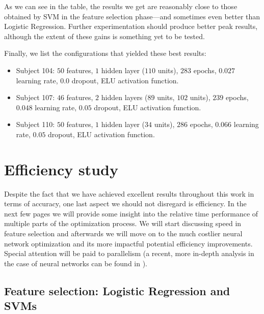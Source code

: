     As we can see in the table, the results we get are reasonably close to those obtained by \acs{SVM} in the feature selection phase---and sometimes even better than Logistic Regression. Further experimentation should produce better peak results, although the extent of these gains is something yet to be tested.

    Finally, we list the configurations that yielded these best results:

    \begin{itemize}

    	\item
    	Subject 104: $50$ features, $1$ hidden layer ($110$ units), $283$ epochs, $0.027$ learning rate, $0.0$ dropout, ELU activation function.

    	\item
    	Subject 107: $46$ features, $2$ hidden layers ($89$ units, $102$ units), $239$ epochs, $0.048$ learning rate, $0.05$ dropout, ELU activation function.

    	\item
    	Subject 110: $50$ features, $1$ hidden layer ($34$ units), $286$ epochs, $0.066$ learning rate, $0.05$ dropout, ELU activation function.

    \end{itemize}

\newpage

\section{Efficiency study}

	Despite the fact that we have achieved excellent results throughout this work in terms of accuracy, one last aspect we should not disregard is efficiency. In the next few pages we will provide some insight into the relative time performance of multiple parts of the optimization process. We will start discussing speed in feature selection and afterwards we will move on to the much costlier neural network optimization and its more impactful potential efficiency improvements. Special attention will be paid to parallelism (a recent, more in-depth analysis in the case of neural networks can be found in \cite{ben2018demystifying}).

	\subsection{Feature selection: Logistic Regression and SVMs}


